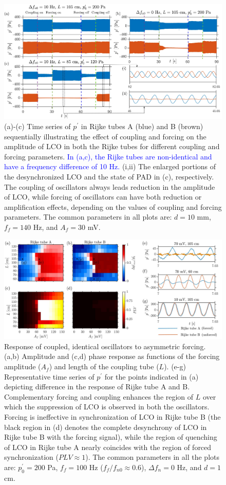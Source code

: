 \documentclass[%
preprint,
 amsmath,amssymb,
 aps,
 pra,
]{revtex4-2}
\begin{document}
\begin{figure}
\centering
\includegraphics[width=1\textwidth]{fig4.jpg}
\caption{\label{long_time_series_all} (a)-(c) Time series of $p^\prime$ in Rijke tubes A (blue) and B (brown) sequentially illustrating the effect of coupling and forcing on the amplitude of LCO in both the Rijke tubes for different coupling and forcing parameters. \textcolor{blue}{In (a,c), the Rijke tubes are non-identical and have a frequency difference of 10 Hz.} (i,ii) The enlarged portions of the desynchronized LCO and the state of PAD in (c), respectively. The coupling of oscillators always leads reduction in the amplitude of LCO, while forcing of oscillators can have both reduction or amplification effects, depending on the values of coupling and forcing parameters. The common parameters in all plots are: $d=10$ mm, $f_f=140$ Hz, and $A_f=30$ mV.}
\end{figure}

\begin{figure}[t!]
\includegraphics[width=\textwidth]{fig5.jpg}
\caption{\label{l_vs_af_prms_plv} Response of coupled, identical oscillators to asymmetric forcing. (a,b) Amplitude and (c,d) phase response as functions of the forcing amplitude ($A_f$) and length of the coupling tube ($L$). (e-g) Representative time series of $p^\prime$ for the points indicated in (a) depicting difference in the response of Rijke tube A and B. Complementary forcing and coupling enhances the region of $L$ over which the suppression of LCO is observed in both the oscillators. Forcing is ineffective in synchronization of LCO in Rijke tube B (the black region in (d) denotes the complete desynchrony of LCO in Rijke tube B with the forcing signal), while the region of quenching of LCO in Rijke tube A nearly coincides with the region of forced synchronization ($PLV \approx 1$). The common parameters in all the plots are: $p^\prime_{0}=200$ Pa, $f_f=100$ Hz ($f_f/f_{n0} \approx 0.6$), $\Delta f_n = 0$ Hz, and $d=1$ cm.}
\end{figure}
\end{document}
